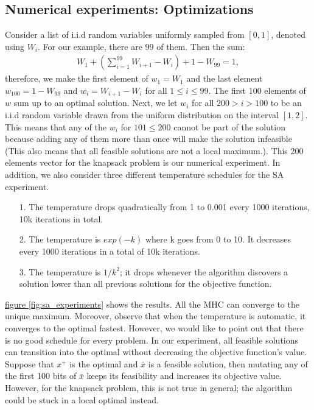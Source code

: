 \documentclass[]{article}
\theoremstyle{definition}
\begin{document}
    \subsection{Numerical experiments: Optimizations}
        Consider a list of i.i.d random variables uniformly sampled from $[0, 1]$, denoted using $W_i$. For our example, there are 99 of them. Then the sum: 
        \begin{align*}
           W_1 + \left(
            \sum_{i = 1}^{99} W_{i + 1} - W_i
           \right) + 1 - W_{99} = 1, 
        \end{align*}
        therefore, we make the first element of $w_1 = W_1$ and the last element $w_{100} = 1 - W_{99}$ and $w_i = W_{i + 1} - W_{i}$ for all $1 \le i \le 99$. The first 100 elements of $w$ sum up to an optimal solution. Next, we let $w_i$ for all $200 > i > 100$ to be an i.i.d random variable drawn from the uniform distribution on the interval $[1, 2]$. This means that any of the $w_i$ for $101 \le 200$ cannot be part of the solution because adding any of them more than once will make the solution infeasible (This also means that all feasible solutions are not a local maximum.). This 200 elements vector for the knapsack problem is our numerical experiment. In addition, we also consider three different temperature schedules for the SA experiment. 
        \begin{itemize}
            \item [1.] The temperature drops quadratically from 1 to 0.001 every 1000 iterations, 10k iterations in total. 
            \item [2.] The temperature is $exp(-k)$ where k goes from 0 to 10. It decreases every 1000 iterations in a total of 10k iterations. 
            \item [3.] The temperature is $1/k^2$; it drops whenever the algorithm discovers a solution lower than all previous solutions for the objective function.
        \end{itemize}
        \hyperref[fig:sa_experiments]{figure \ref*{fig:sa_experiments}} shows the results. All the MHC can converge to the unique maximum. Moreover, observe that when the temperature is automatic, it converges to the optimal fastest. However, we would like to point out that there is no good schedule for every problem. In our experiment, all feasible solutions can transition into the optimal without decreasing the objective function's value. Suppose that $x^+$  is the optimal and $\bar x$ is a feasible solution, then mutating any of the first 100 bits of $\bar x$ keeps its feasibility and increases its objective value. However, for the knapsack problem, this is not true in general; the algorithm could be stuck in a local optimal instead. 
\end{document}
